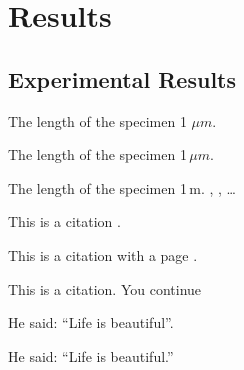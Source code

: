 \chapter{Results}

\section{Experimental Results}

The length of the specimen 1 $\mu m$.

The length of the specimen 1\,\(\mu m\).

The length of the specimen 1\,\umu m. \ualpha, \ubeta, \dots



This is a citation \cite{ernst-1984-234}.

This is a citation with a page \citep[123]{ernst-1984-234}.

This is a citation.\cite{ernst-1984-234} You continue

He said: ``Life is beautiful''.

He said: ``Life is beautiful.''

% 				
% 



